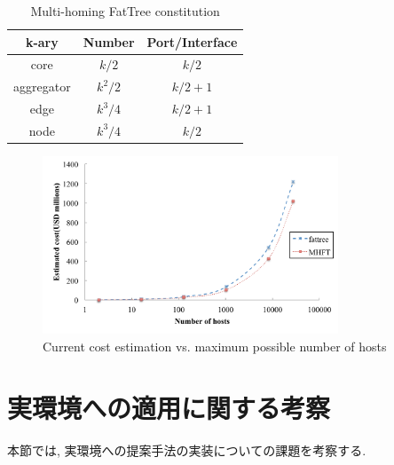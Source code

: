 \begin{table}[t]
    \begin{center}
    \caption{Multi-homing FatTree constitution}
    \begin{tabular}{c|c|c}
    k-ary & Number & Port/Interface \\ \hline
    core & $k/2$ & $k/2$ \\ \hline
    aggregator & $k^2/2$ & $k / 2 + 1$ \\ \hline
    edge & $k^3 / 4$ & $k / 2 + 1$ \\ \hline
    node & $k^3 / 4$ & $k / 2$ \\
    \hline
    \end{tabular}
    \label{table:mhft_constitution}
    \end{center}
\end{table}


\begin{figure}[t]
    \begin{center}
    \includegraphics[autoebb, width=250pt]{./img/mhft_cost.pdf}
    \caption{Current cost estimation vs. maximum possible number of hosts}
    \label{fig:MHFT_cost}
    \end{center}
\end{figure}

\section{実環境への適用に関する考察}
本節では, 実環境への提案手法の実装についての課題を考察する. 

